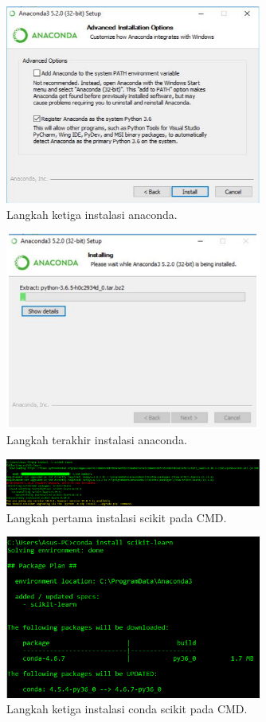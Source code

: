 \begin{figure}[ht]\centerline{\includegraphics[width=0.75\textwidth]{figures/a4.PNG}}\caption{Langkah ketiga instalasi anaconda.}\end{figure}
\begin{figure}[ht]\centerline{\includegraphics[width=0.75\textwidth]{figures/a5.PNG}}\caption{Langkah terakhir instalasi anaconda.}\end{figure}
\begin{figure}[ht]\centerline{\includegraphics[width=0.75\textwidth]{figures/a6.PNG}}\caption{Langkah pertama instalasi scikit pada CMD.}\end{figure}
\begin{figure}[ht]\centerline{\includegraphics[width=0.75\textwidth]{figures/a7.PNG}}\caption{Langkah ketiga instalasi conda scikit pada CMD.}\end{figure}
